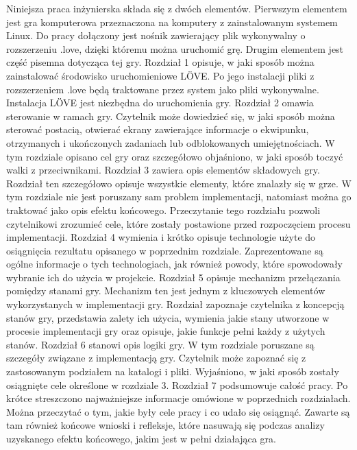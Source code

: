 Niniejsza praca inżynierska składa się z dwóch elementów. Pierwszym elementem
jest gra komputerowa przeznaczona na komputery z zainstalowanym systemem Linux.
Do pracy dołączony jest nośnik zawierający plik wykonywalny o rozszerzeniu
.love, dzięki któremu można uruchomić grę. Drugim elementem jest część pisemna 
dotycząca tej gry.
Rozdział 1 opisuje, w jaki sposób można zainstalować środowisko uruchomieniowe
LÖVE. Po jego instalacji pliki z rozszerzeniem .love będą traktowane przez
system jako pliki wykonywalne. Instalacja LÖVE jest niezbędna do uruchomienia
gry.
Rozdział 2 omawia sterowanie w ramach gry. Czytelnik może dowiedzieć się, w
jaki sposób można sterować postacią, otwierać ekrany zawierające informacje o
ekwipunku, otrzymanych i ukończonych zadaniach lub odblokowanych
umiejętnościach. W tym rozdziale opisano cel gry oraz szczegółowo objaśniono,
w jaki sposób toczyć walki z przeciwnikami.
Rozdział 3 zawiera opis elementów składowych gry. Rozdział ten szczegółowo
opisuje wszystkie elementy, które znalazły się w grze. W tym rozdziale nie jest
poruszany sam problem implementacji, natomiast można go traktować jako opis
efektu końcowego. Przeczytanie tego rozdziału pozwoli czytelnikowi zrozumieć
cele, które zostały postawione przed rozpoczęciem procesu implementacji.
Rozdział 4 wymienia i krótko opisuje technologie użyte do osiągnięcia rezultatu
opisanego w poprzednim rozdziale. Zaprezentowane są ogólne informacje o tych
technologiach, jak również powody, które spowodowały wybranie ich do użycia w
projekcie.
Rozdział 5 opisuje mechanizm przełączania pomiędzy stanami gry. Mechanizm ten
jest jednym z kluczowych elementów wykorzystanych w implementacji gry. Rozdział
zapoznaje czytelnika z koncepcją stanów gry, przedstawia zalety ich użycia,
wymienia jakie stany utworzone w procesie implementacji gry oraz opisuje, jakie
funkcje pełni każdy z użytych stanów.
Rozdział 6 stanowi opis logiki gry. W tym rozdziale poruszane są szczegóły
związane z implementacją gry. Czytelnik może zapoznać się z zastosowanym
podziałem na katalogi i pliki. Wyjaśniono, w jaki sposób zostały osiągnięte cele
określone w rozdziale 3.
Rozdział 7 podsumowuje całość pracy. Po krótce streszczono najważniejsze
informacje omówione w poprzednich rozdziałach. Można przeczytać o tym, jakie
były cele pracy i co udało się osiągnąć. Zawarte są tam również końcowe wnioski
i refleksje, które nasuwają się podczas analizy uzyskanego efektu końcowego,
jakim jest w pełni działająca gra.